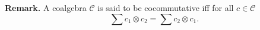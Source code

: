 \documentclass[a4paper, 12pt]{article}
\begin{document}
\textbf{Remark. } A coalgebra $\mathcal{C} $ is said to be cocommutative iff for all $c \in \mathcal{C} $
\begin{equation*}
\sum c_1 \otimes c_2 = \sum c_2 \otimes c_1.
\end{equation*}
\end{document}
